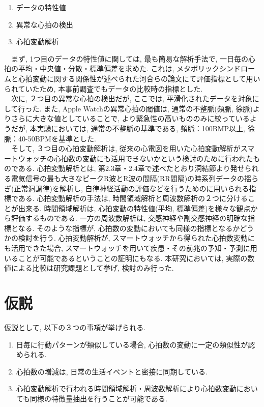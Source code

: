 \documentclass[report, 11pt, a4paper]{jsbook}
\begin{document}
\begin{enumerate}
  \item データの特性値
  \item 異常な心拍の検出
  \item 心拍変動解析
\end{enumerate}

　まず, 1つ目のデータの特性値に関しては, 最も簡易な解析手法で, 一日毎の心拍の平均・中央値・分散・標準偏差を求めた. これは, メタボリックシンドロームと心拍変動に関する関係性が述べられた河合らの論文\cite{metabo}にて評価指標として用いられていたため, 本事前調査でもデータの比較時の指標とした. \\
　次に, ２つ目の異常な心拍の検出だが, ここでは, 平滑化されたデータを対象にして行った. また, Apple Watchの異常心拍の閾値は, 通常の不整脈(頻脈, 徐脈)よりさらに大きな値としていることで, より緊急性の高いもののみに絞っているようだが, 本実験においては, 通常の不整脈の基準である, 頻脈：100BMP以上, 徐脈：40-50BPMを基準とした. \\
　そして, ３つ目の心拍変動解析は, 従来の心電図を用いた心拍変動解析がスマートウォッチの心拍数の変動にも活用できないかという検討のために行われたものである. 心拍変動解析とは, 第2.3章・2.4章で述べたとおり洞結節より発せられる電気信号の最も大きなピークR波とR波の間隔(RR間隔)の時系列データの揺らぎ(正常洞調律)を解析し, 自律神経活動の評価などを行うためのに用いられる指標である. 心拍変動解析の手法は, 時間領域解析と周波数解析の２つに分けることが出来る. 時間領域解析は, 心拍変動の特性値(平均, 標準偏差)を様々な観点から評価するものである. 一方の周波数解析は, 交感神経や副交感神経の明確な指標となる. そのような指標が, 心拍数の変動においても同様の指標となるかどうかの検討を行う.  心拍変動解析が, スマートウォッチから得られた心拍数変動にも活用できた場合, スマートウォッチを用いて疾患・その前兆の予知・予測に用いることが可能であるということの証明にもなる. 本研究においては, 実際の数値による比較は研究課題として挙げ, 検討のみ行った. 

\section{仮説}

仮説として, 以下の３つの事項が挙げられる. 

\begin{enumerate}
  \item 日毎に行動パターンが類似している場合, 心拍数の変動に一定の類似性が認められる.
  \item 心拍数の増減は, 日常の生活イベントと密接に同期している. 
  \item 心拍変動解析で行われる時間領域解析・周波数解析により心拍数変動においても同様の特徴量抽出を行うことが可能である.
\end{enumerate}
\end{document}
